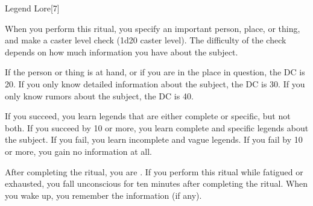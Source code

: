 \begin{spellsection}[Greater]{Legend Lore}[7]
    \begin{spellheader}
    \end{spellheader}
    \begin{spellcontent}
        \begin{spelltargetinginfo}
        \end{spelltargetinginfo}
        \begin{spelleffects}

            \spellline
            \spelleffect When you perform this ritual, you specify an important person, place, or thing, and make a caster level check (1d20 \add caster level). The difficulty of the check depends on how much information you have about the subject.

            If the person or thing is at hand, or if you are in the place in question, the DC is 20. If you only know detailed information about the subject, the DC is 30. If you only know rumors about the subject, the DC is 40.

            If you succeed, you learn legends that are either complete or specific, but not both. If you succeed by 10 or more, you learn complete and specific legends about the subject.  If you fail, you learn incomplete and vague legends. If you fail by 10 or more, you gain no information at all.

            After completing the ritual, you are \exhausted. If you perform this ritual while fatigued or exhausted, you fall unconscious for ten minutes after completing the ritual. When you wake up, you remember the information (if any).
        \end{spelleffects}
    \end{spellcontent}
    \begin{spellfooter}
    \end{spellfooter}
\end{spellsection}

